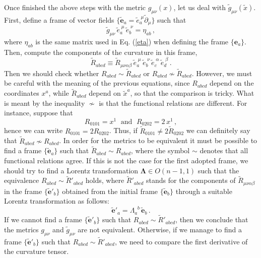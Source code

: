 \documentclass[twocolumn,prd,aps,showpacs,showkeys,amsmath,amssymb]{revtex4-1}
\newcommand{\bl}{\boldsymbol}
\begin{document}
Once finished the above steps with the metric $g_{\mu\nu}(x)$, let us deal with $\tilde{g}_{\mu\nu}(\tilde{x})$. First, define a frame of vector fields $\{\tilde{\mathbf{e}}_a = \tilde{e}_a^{\;\mu}\tilde{\partial}_\mu\}$ such that
\begin{equation*}
  \tilde{g}_{\mu\nu}\,  \tilde{e}_a^{\;\mu}\, \tilde{e}_b^{\;\nu} = \eta_{ab}\,,
\end{equation*}
where $\eta_{ab}$ is the same matrix used in Eq. (\ref{eta}) when defining the frame $\{\bl{e}_a\}$. Then, compute the components of the curvature in this frame,
\begin{equation*}
  \tilde{R}_{abcd} \equiv \tilde{R}_{\mu\nu\alpha\beta}\,\tilde{e}_a^{\;\mu}\, \tilde{e}_b^{\;\nu}\,\tilde{e}_c^{\;\alpha}\, \tilde{e}_d^{\;\beta}\,.
\end{equation*}
Then we should check whether $R_{abcd} \sim \tilde{R}_{abcd}$ or $R_{abcd}\nsim \tilde{R}_{abcd}$. However, we must be careful with the meaning of the previous equations, since $R_{abcd}$ depend on the coordinates $x^a$, while $\tilde{R}_{abcd}$ depend on $\tilde{x}^a$, so that the comparison is tricky. What is meant by the inequality $\nsim$ is that the functional relations are different. For instance, suppose that
\begin{equation*}
  R_{0101} = x^1 \; \textrm{ and } \;   R_{0202} = 2\, x^1 \,,
\end{equation*}
hence we can write $R_{0101} = 2 R_{0202}$. Thus, if $\tilde{R}_{0101} \neq 2\tilde{R}_{0202}$ we can definitely say that $\tilde{R}_{abcd} \nsim R_{abcd}  $. In order for the metrics to be equivalent it must be possible to find a frame $\{\tilde{\mathbf{e}}_a\}$ such that $\tilde{R}_{abcd} \sim R_{abcd}$, where the symbol $\sim$ denotes that all functional relations agree. If this is not the case for the first adopted frame, we should try to find a Lorentz transformation $\mathbf{\Lambda}\in O(n-1,1)$ such that the equivalence $R_{abcd} \sim \tilde{R}'_{abcd}$ holds, where $\tilde{R}'_{abcd}$ stands for the components of $\tilde{R}_{\mu\nu\alpha\beta}$ in the frame $\{\tilde{\mathbf{e}}'_b\}$ obtained from the initial frame $\{\tilde{\mathbf{e}}_b\}$ through a suitable Lorentz transformation as follows:
\begin{equation}\label{etil'}
   \tilde{ \textbf{e}}'_a = \Lambda_a^{\;\;b} \, \tilde{\textbf{e}}_b \,.
\end{equation}
If we cannot find a frame $\{\tilde{\mathbf{e}}'_b\}$  such that $R_{abcd} \sim \tilde{R}'_{abcd}$, then we conclude that the metrics $g_{\mu\nu}$ and $\tilde{g}_{\mu\nu}$ are not equivalent. Otherwise, if we manage to find a frame  $\{\tilde{\mathbf{e}}'_b\}$ such that $R_{abcd} \sim \tilde{R}'_{abcd}$, we need to compare the first derivative of the curvature tensor.
\end{document}
